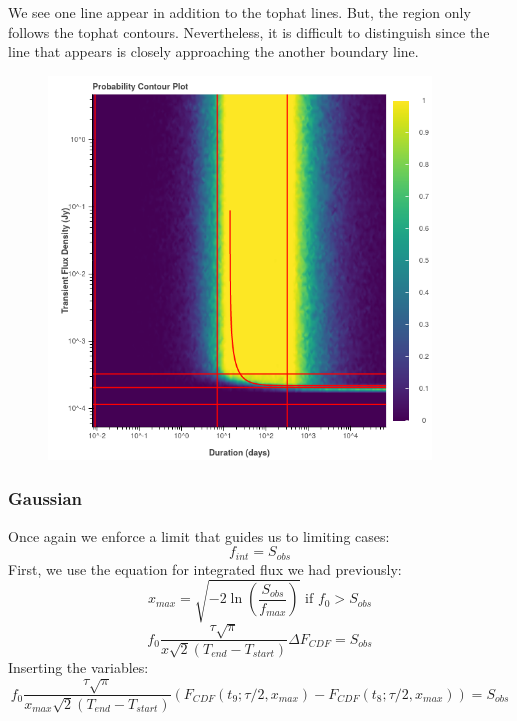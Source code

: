 \documentclass{article}
\begin{document}
We see one line appear in addition to the tophat lines. But, the region only follows the tophat contours. Nevertheless, it is difficult to distinguish since the line that appears is closely approaching the another boundary line.
\begin{figure}[H] 
	\begin{center}
		\includegraphics[width=4in]{output_parabolic_ProbContour.png}
		
		\label{tophat}
	\end{center}
\end{figure}



\subsubsection{Gaussian}
Once again we enforce a limit that guides us to limiting cases:
\[f_{int} = S_{obs}\]
 First, we use the equation for integrated flux we had previously:
\[x_{max}=\sqrt{-2\ln(\frac{S_{obs}}{f_{max}})}\text{ if }f_0>S_{obs}\]
\[ f_0 \frac{\tau\sqrt{\pi}}{x\sqrt{2}(T_{end}-T_{start})}\Delta F_{CDF} =  S_{obs}\]
Inserting the variables:
\[f_0  \frac{\tau\sqrt{\pi}}{x_{max}\sqrt{2}(T_{end}-T_{start})}(F_{CDF}(t_9; \tau/2,x_{max}) -F_{CDF}(t_8; \tau/2, x_{max})) =  S_{obs}\]
\end{document}
